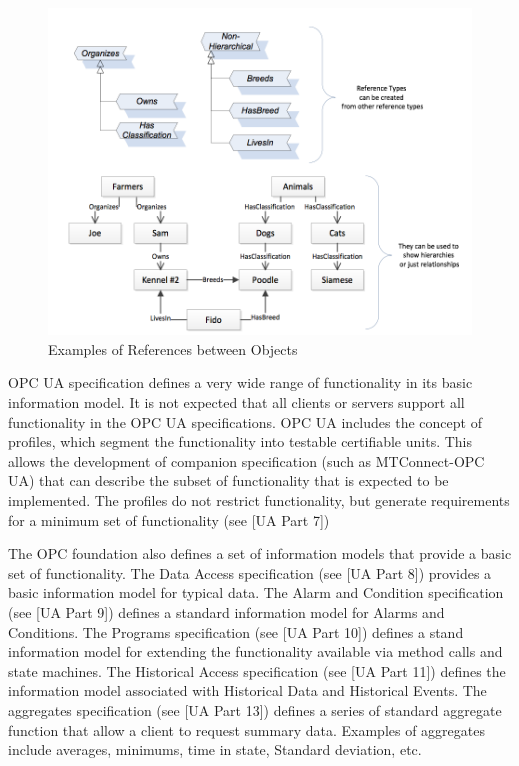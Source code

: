\documentclass{mtconnect}	%
\begin{document}
\begin{figure}[h]
  \centering
  \includegraphics[width=1.0\textwidth]{diagrams/RefsBetweenObjects.png}
  \caption{Examples of References between Objects}
  \label{fig:ref_bet_objs}
\end{figure}

OPC UA specification defines a very wide range of functionality in its basic information model. It is not expected that all clients or servers support all functionality in the OPC UA specifications. OPC UA includes the concept of profiles, which segment the functionality into testable certifiable units. This allows the development of companion specification (such as MTConnect-OPC UA) that can describe the subset of functionality that is expected to be implemented. The profiles do not restrict functionality, but generate requirements for a minimum set of functionality (see [UA Part 7])

The OPC foundation also defines a set of information models that provide a basic set of functionality. The Data Access specification (see [UA Part 8]) provides a basic information model for typical data. The Alarm and Condition specification (see [UA Part 9]) defines a standard information model for Alarms and Conditions. The Programs specification (see [UA Part 10]) defines a stand information model for extending the functionality available via method calls and state machines. The Historical Access specification (see [UA Part 11]) defines the information model associated with Historical Data and Historical Events. The aggregates specification (see [UA Part 13]) defines a series of standard aggregate function that allow a client to request summary data. Examples of aggregates include averages, minimums, time in state, Standard deviation, etc. 
\end{document}
